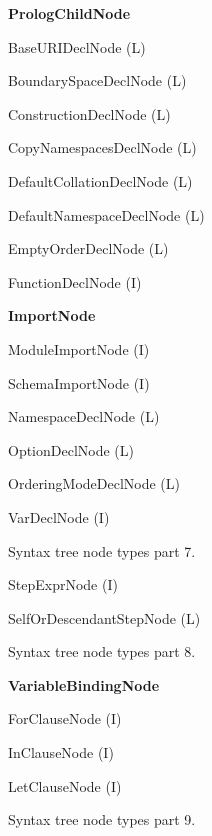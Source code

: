 \begin{figure}
\caption{Syntax tree node types part 7.}
\label{FIG_syntax_tree_node_types_part_7}
\begin{description}
\item \textbf{PrologChildNode}
  \begin{description}
  \item BaseURIDeclNode (L)
  \item BoundarySpaceDeclNode (L)
  \item ConstructionDeclNode (L)
  \item CopyNamespacesDeclNode (L)
  \item DefaultCollationDeclNode (L)
  \item DefaultNamespaceDeclNode (L)
  \item EmptyOrderDeclNode (L)
  \item FunctionDeclNode (I)
  \item \textbf{ImportNode}
    \begin{description}
    \item ModuleImportNode (I)
    \item SchemaImportNode (I)
    \end{description}
  \item NamespaceDeclNode (L)
  \item OptionDeclNode (L)
  \item OrderingModeDeclNode (L)
  \item VarDeclNode (I)
  \end{description}
\end{description}
\end{figure}

\begin{figure}
\caption{Syntax tree node types part 8.}
\label{FIG_syntax_tree_node_types_part_8}
\begin{description}
\item StepExprNode (I)
  \begin{description}
  \item SelfOrDescendantStepNode (L)
  \end{description}
\end{description}
\end{figure}

\begin{figure}
\caption{Syntax tree node types part 9.}
\label{FIG_syntax_tree_node_types_part_9}
\begin{description}
\item \textbf{VariableBindingNode}
  \begin{description}
  \item ForClauseNode (I)
  \item InClauseNode (I)
  \item LetClauseNode (I)
  \end{description}
\end{description}
\end{figure}

